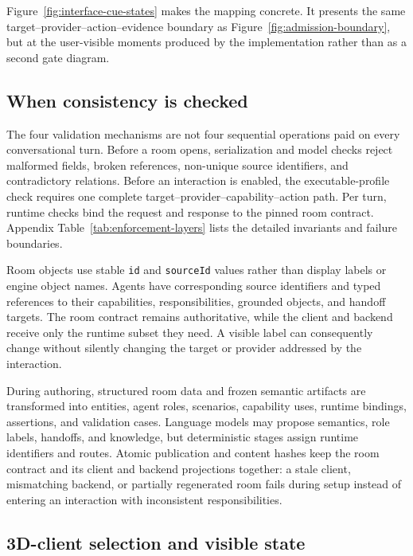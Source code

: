 Figure~\ref{fig:interface-cue-states} makes the mapping concrete.  It presents
the same target--provider--action--evidence boundary as
Figure~\ref{fig:admission-boundary}, but at the user-visible moments produced by
the implementation rather than as a second gate diagram.

\FloatBarrier

\FloatBarrier

\subsection{When consistency is checked}

The four validation mechanisms are not four sequential operations paid on
every conversational turn.  Before a room opens, serialization and model
checks reject malformed fields, broken references, non-unique source
identifiers, and contradictory relations.  Before an interaction is enabled,
the executable-profile check requires one complete
target--provider--capability--action path.  Per turn, runtime checks bind the
request and response to the pinned room contract.  Appendix
Table~\ref{tab:enforcement-layers} lists the detailed invariants and failure
boundaries.

Room objects use stable \texttt{id} and \texttt{sourceId} values rather than
display labels or engine object names.  Agents have corresponding source
identifiers and typed references to their capabilities, responsibilities,
grounded objects, and handoff targets.  The room contract remains
authoritative, while the client and backend receive only the runtime subset
they need.  A visible label can consequently change without silently changing
the target or provider addressed by the interaction.

During authoring, structured room data and frozen semantic artifacts are
transformed into entities, agent roles, scenarios, capability uses, runtime
bindings, assertions, and validation cases.  Language models may propose
semantics, role labels, handoffs, and knowledge, but deterministic stages assign
runtime identifiers and routes.  Atomic publication and content hashes keep
the room contract and its client and backend projections together: a stale
client, mismatching backend, or partially regenerated room fails during setup
instead of entering an interaction with inconsistent responsibilities.

\subsection{3D-client selection and visible state}

